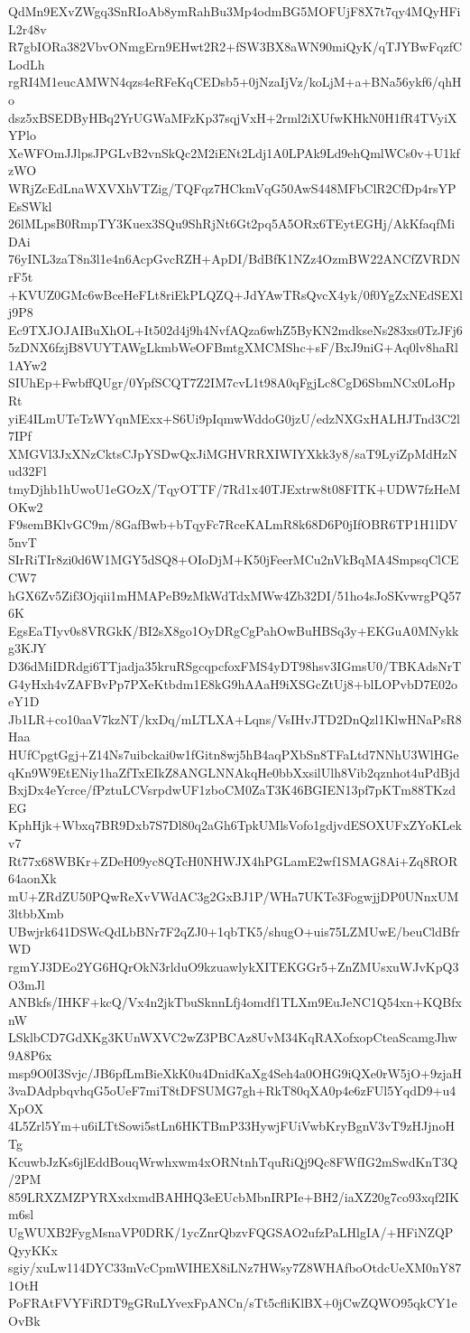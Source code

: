 QdMn9EXvZWgq3SnRIoAb8ymRahBu3Mp4odmBG5MOFUjF8X7t7qy4MQyHFiL2r48v
R7gbIORa382VbvONmgErn9EHwt2R2+fSW3BX8aWN90miQyK/qTJYBwFqzfCLodLh
rgRI4M1eucAMWN4qzs4eRFeKqCEDsb5+0jNzaIjVz/koLjM+a+BNa56ykf6/qhHo
dsz5xBSEDByHBq2YrUGWaMFzKp37sqjVxH+2rml2iXUfwKHkN0H1fR4TVyiXYPlo
XeWFOmJJlpsJPGLvB2vnSkQc2M2iENt2Ldj1A0LPAk9Ld9ehQmlWCs0v+U1kfzWO
WRjZcEdLnaWXVXhVTZig/TQFqz7HCkmVqG50AwS448MFbClR2CfDp4rsYPEsSWkl
26lMLpsB0RmpTY3Kuex3SQu9ShRjNt6Gt2pq5A5ORx6TEytEGHj/AkKfaqfMiDAi
76yINL3zaT8n3l1e4n6AcpGvcRZH+ApDI/BdBfK1NZz4OzmBW22ANCfZVRDNrF5t
+KVUZ0GMc6wBceHeFLt8riEkPLQZQ+JdYAwTRsQvcX4yk/0f0YgZxNEdSEXlj9P8
Ec9TXJOJAIBuXhOL+It502d4j9h4NvfAQza6whZ5ByKN2mdkseNs283xs0TzJFj6
5zDNX6fzjB8VUYTAWgLkmbWeOFBmtgXMCMShc+sF/BxJ9niG+Aq0lv8haRl1AYw2
SIUhEp+FwbffQUgr/0YpfSCQT7Z2IM7cvL1t98A0qFgjLc8CgD6SbmNCx0LoHpRt
yiE4ILmUTeTzWYqnMExx+S6Ui9pIqmwWddoG0jzU/edzNXGxHALHJTnd3C2l7IPf
XMGVl3JxXNzCktsCJpYSDwQxJiMGHVRRXIWIYXkk3y8/saT9LyiZpMdHzNud32Fl
tmyDjhb1hUwoU1eGOzX/TqyOTTF/7Rd1x40TJExtrw8t08FITK+UDW7fzHeMOKw2
F9semBKlvGC9m/8GafBwb+bTqyFc7RceKALmR8k68D6P0jIfOBR6TP1H1lDV5nvT
SIrRiTIr8zi0d6W1MGY5dSQ8+OIoDjM+K50jFeerMCu2nVkBqMA4SmpsqClCECW7
hGX6Zv5Zif3Ojqii1mHMAPeB9zMkWdTdxMWw4Zb32DI/51ho4sJoSKvwrgPQ576K
EgsEaTIyv0s8VRGkK/BI2sX8go1OyDRgCgPahOwBuHBSq3y+EKGuA0MNykkg3KJY
D36dMiIDRdgi6TTjadja35kruRSgcqpcfoxFMS4yDT98hsv3IGmsU0/TBKAdsNrT
G4yHxh4vZAFBvPp7PXeKtbdm1E8kG9hAAaH9iXSGcZtUj8+blLOPvbD7E02oeY1D
Jb1LR+co10aaV7kzNT/kxDq/mLTLXA+Lqns/VsIHvJTD2DnQzl1KlwHNaPsR8Haa
HUfCpgtGgj+Z14Ns7uibckai0w1fGitn8wj5hB4aqPXbSn8TFaLtd7NNhU3WlHGe
qKn9W9EtENiy1haZfTxEIkZ8ANGLNNAkqHe0bbXxsilUlh8Vib2qznhot4uPdBjd
BxjDx4eYcrce/fPztuLCVsrpdwUF1zboCM0ZaT3K46BGIEN13pf7pKTm88TKzdEG
KphHjk+Wbxq7BR9Dxb7S7Dl80q2aGh6TpkUMlsVofo1gdjvdESOXUFxZYoKLekv7
Rt77x68WBKr+ZDeH09yc8QTcH0NHWJX4hPGLamE2wf1SMAG8Ai+Zq8ROR64aonXk
mU+ZRdZU50PQwReXvVWdAC3g2GxBJ1P/WHa7UKTe3FogwjjDP0UNnxUM3ltbbXmb
UBwjrk641DSWcQdLbBNr7F2qZJ0+1qbTK5/shugO+uis75LZMUwE/beuCldBfrWD
rgmYJ3DEo2YG6HQrOkN3rlduO9kzuawlykXITEKGGr5+ZnZMUsxuWJvKpQ3O3mJl
ANBkfs/IHKF+kcQ/Vx4n2jkTbuSknnLfj4omdf1TLXm9EuJeNC1Q54xn+KQBfxnW
LSklbCD7GdXKg3KUnWXVC2wZ3PBCAz8UvM34KqRAXofxopCteaScamgJhw9A8P6x
msp9O0I3Svjc/JB6pfLmBieXkK0u4DnidKaXg4Seh4a0OHG9iQXe0rW5jO+9zjaH
3vaDAdpbqvhqG5oUeF7miT8tDFSUMG7gh+RkT80qXA0p4e6zFUl5YqdD9+u4XpOX
4L5Zrl5Ym+u6iLTtSowi5stLn6HKTBmP33HywjFUiVwbKryBgnV3vT9zHJjnoHTg
KcuwbJzKs6jlEddBouqWrwhxwm4xORNtnhTquRiQj9Qc8FWfIG2mSwdKnT3Q/2PM
859LRXZMZPYRXxdxmdBAHHQ3eEUcbMbnIRPIe+BH2/iaXZ20g7co93xqf2IKm6sl
UgWUXB2FygMsnaVP0DRK/1ycZnrQbzvFQGSAO2ufzPaLHlgIA/+HFiNZQPQyyKKx
sgiy/xuLw114DYC33mVcCpmWIHEX8iLNz7HWsy7Z8WHAfboOtdcUeXM0nY871OtH
PoFRAtFVYFiRDT9gGRuLYvexFpANCn/sTt5cfliKlBX+0jCwZQWO95qkCY1eOvBk
